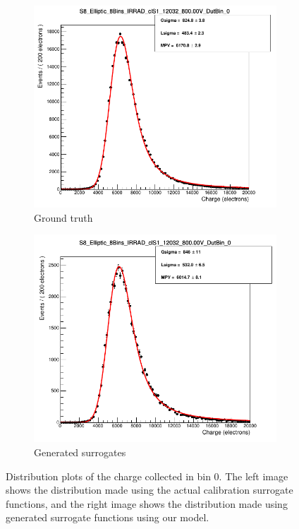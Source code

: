 \begin{figure}[H]
    \centering
\begin{subfigure}{0.4\textwidth}
    \centering
    \includegraphics[width=\linewidth]{figures/chapter4/surrogates/S8_Elliptic_8Bins_labCalib.png}
    \caption{Ground truth}
  \end{subfigure}
\begin{subfigure}{0.4\textwidth}
    \centering
    \includegraphics[width=\linewidth]{figures/chapter4/surrogates/S8_Elliptic_8Bins_rndCalib8Bins.png}
    \caption{Generated surrogates}
  \end{subfigure}
    \caption{Distribution plots of the charge collected in bin 0. The left image shows the distribution made using the actual calibration surrogate functions, and the right image shows the distribution made using generated surrogate functions using our model.}
    \label{plot:landau_example}

\end{figure}

